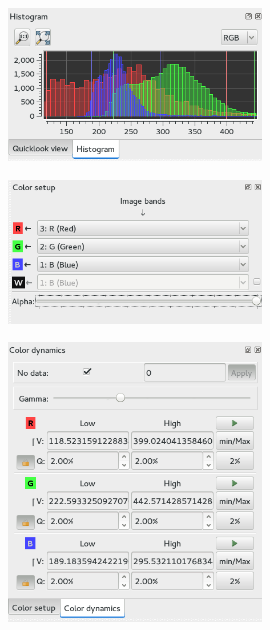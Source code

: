 \begin{figure}[!h] 
  \center
  \includegraphics[width=0.6\textwidth]{../Art/MonteverdiImages/histo.png}
  \label{fig:histo}
\end{figure}

\begin{figure}[!h] 
  \center
  \includegraphics[width=0.6\textwidth]{../Art/MonteverdiImages/colset.png}
  \label{fig:colorset}
\end{figure}

\begin{figure}[!h] 
  \center
  \includegraphics[width=0.6\textwidth]{../Art/MonteverdiImages/coldyn.png}
  \label{fig:coldyn}
\end{figure}


